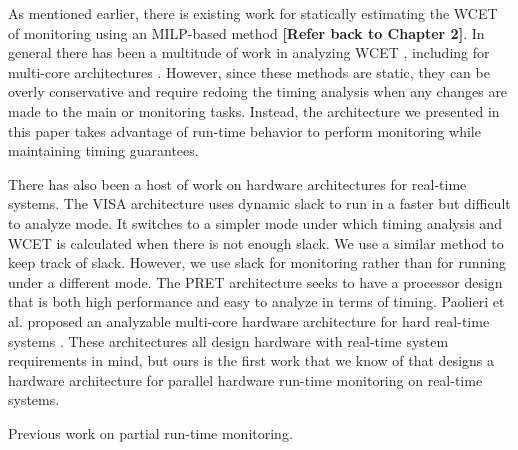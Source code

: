 As mentioned earlier, there is existing work for statically estimating the WCET of
monitoring using an MILP-based method \cite{lo-monitoring_wcet-dac12} \textbf{[Refer back to Chapter 2]}. In
general there has been a multitude of work in analyzing WCET \cite{wcetsurvey-tecs08},
including for multi-core architectures \cite{chattopadhyay-rtas12,
mcait-rtss10}.  However, since these methods are static, they can be overly
conservative and require redoing the timing analysis when any changes are made
to the main or monitoring tasks. Instead, the architecture we presented in this
paper takes advantage of run-time behavior to perform monitoring while
maintaining timing guarantees.

There has also been a host of work on hardware architectures for real-time
systems.  The VISA architecture \cite{visa-isca03} uses dynamic
slack to run in a faster but
difficult to analyze mode. It switches to a simpler mode under which timing
analysis and WCET is calculated when there is not enough slack. We use a
similar method to keep track of slack. However, we use slack for monitoring
rather than for running under a different mode. The PRET
architecture \cite{ptarm-iccd12} seeks to have a processor design that is both high performance and
easy to analyze in terms of timing. Paolieri et al. proposed an analyzable
multi-core hardware architecture for hard real-time systems
\cite{paolieri-isca09}. These architectures all design hardware
with real-time system requirements in mind, but ours is the first work that we
know of that designs a hardware architecture for parallel hardware run-time monitoring
on real-time systems.


\begin{table}[t]
  \begin{center}
    \begin{normalsize}
    
    \end{normalsize}
    \caption{Previous work on partial run-time monitoring.}
    \label{tab:related.previous_sampling}
  \end{center}
\end{table}

